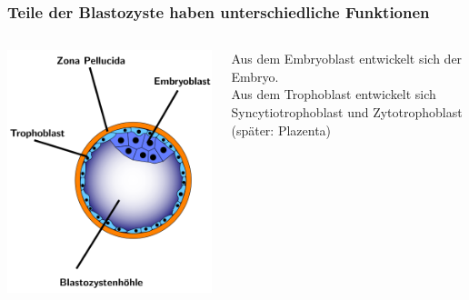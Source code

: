 \documentclass{beamer}
\begin{document}

\begin{frame}
\frametitle{Teile der Blastozyste haben unterschiedliche Funktionen}

\begin{columns}[c]

\begin{column}{5cm}
\begin{center}
    \includegraphics[width=\textwidth]{Blastozyste.png}
\end{center}
\end{column}

\begin{column}{5cm}

Aus dem Embryoblast entwickelt sich der Embryo. \\[0.2 cm]

Aus dem Trophoblast entwickelt sich Syncytiotrophoblast und Zytotrophoblast (später: Plazenta)

\end{column}

\end{columns}

\end{frame}
\end{document}
